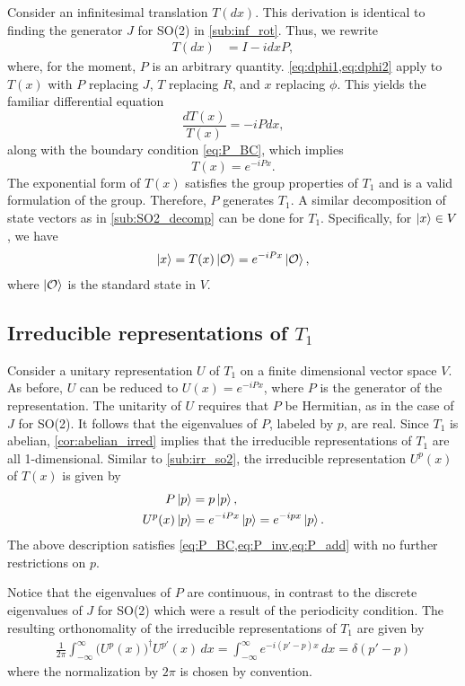 Consider an infinitesimal translation $T(dx)$. This derivation is identical to finding the generator $J$ for SO(2) in \cref{sub:inf_rot}. Thus, we rewrite
\begin{align*}
    T(dx) &= I - i dx P,
\end{align*}
where, for the moment, $P$ is an arbitrary quantity. \cref{eq:dphi1,eq:dphi2} apply to $T(x)$ with $P$ replacing $J$, $T$ replacing $R$, and $x$ replacing $\phi$. This yields the familiar differential equation
\begin{equation}
    \frac{dT(x)}{T(x)} = -iP dx,
\end{equation}
along with the boundary condition \cref{eq:P_BC}, which implies
\begin{equation}
    T(x) = e^{-iPx}.
\end{equation}
The exponential form of $T(x)$ satisfies the group properties of $T_1$ and is a valid formulation of the group. Therefore, $P$ generates $T_1$. A similar decomposition of state vectors as in \cref{sub:SO2_decomp} can be done for $T_1$. Specifically, for $\ket{x}\in V$, we have
\begin{align*}
    \ket{x} = T(x)\ket{\mathcal{O}} = e^{-iPx}\ket{\mathcal{O}},
\end{align*}
where $\ket{\mathcal{O}}$ is the standard state in $V$.

\subsection{Irreducible representations of $T_1$}
Consider a unitary representation $U$ of $T_1$ on a finite dimensional vector space $V$. As before, $U$ can be reduced to $U(x) = e^{-iPx}$, where $P$ is the generator of the representation. The unitarity of $U$ requires that $P$ be Hermitian, as in the case of $J$ for SO(2). It follows that the eigenvalues of $P$, labeled by $p$, are real. Since $T_1$ is abelian, \cref{cor:abelian_irred} implies that the irreducible representations of $T_1$ are all 1-dimensional. Similar to \cref{sub:irr_so2}, the irreducible representation $U^p(x)$ of $T(x)$ is given by
\begin{align*}
    P\ket{p} &= p\ket{p}, \\
    U^p(x)\ket{p} &= e^{-iPx}\ket{p} = e^{-ip x}\ket{p}.
\end{align*}
The above description satisfies \cref{eq:P_BC,eq:P_inv,eq:P_add} with no further restrictions on $p$. 

Notice that the eigenvalues of $P$ are continuous, in contrast to the discrete eigenvalues of $J$ for SO(2) which were a result of the periodicity condition. The resulting orthonomality of the irreducible representations of $T_1$ are given by
\begin{align*}
    \frac{1}{2\pi}\int_{-\infty}^{\infty} {\bigl(U^p(x)\bigr)}^\dagger U^{p'}(x) \,dx = \int_{-\infty}^{\infty} e^{-i(p'-p)x} \,dx = \delta(p'-p)
\end{align*}
where the normalization by $2\pi$ is chosen by convention.

